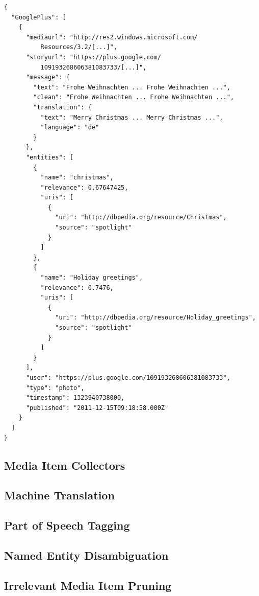 \documentclass{acm_proc_article-sp}
\begin{document}
\begin{lstlisting}[caption={Sample output of the media collector showing a Google+ post originally authored in German, then translated to English, and finally processed with named entity extraction and disambiguation (slightly edited for legibility).},label={lst:media}]
{
  "GooglePlus": [
    {
      "mediaurl": "http://res2.windows.microsoft.com/
          Resources/3.2/[...]",
      "storyurl": "https://plus.google.com/
          109193268606381083733/[...]",
      "message": {
        "text": "Frohe Weihnachten ... Frohe Weihnachten ...",
        "clean": "Frohe Weihnachten ... Frohe Weihnachten ...",
        "translation": {
          "text": "Merry Christmas ... Merry Christmas ...",
          "language": "de"
        }
      },
      "entities": [
        {
          "name": "christmas",
          "relevance": 0.67647425,
          "uris": [
            {
              "uri": "http://dbpedia.org/resource/Christmas",
              "source": "spotlight"
            }
          ]
        },
        {
          "name": "Holiday greetings",
          "relevance": 0.7476,
          "uris": [
            {
              "uri": "http://dbpedia.org/resource/Holiday_greetings",
              "source": "spotlight"
            }
          ]
        }
      ],
      "user": "https://plus.google.com/109193268606381083733",
      "type": "photo",
      "timestamp": 1323940738000,
      "published": "2011-12-15T09:18:58.000Z"
    }
  ]
}
\end{lstlisting}

\subsection{Media Item Collectors}

\subsection{Machine Translation}

\subsection{Part of Speech Tagging}

\subsection{Named Entity Disambiguation}

\subsection{Irrelevant Media Item Pruning}
\end{document}

